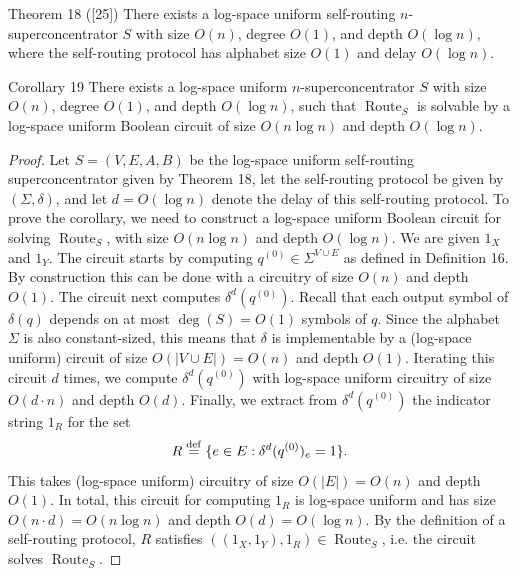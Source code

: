 \begin{originalresult}{Theorem 18 ([25])}
There exists a log-space uniform self-routing $n$-superconcentrator $S$ with size $O(n)$, degree $O(1)$, and depth $O(\log n)$, where the self-routing protocol has alphabet size $O(1)$ and delay $O(\log n)$.
\end{originalresult}
\begin{originalresult}{Corollary 19}
There exists a log-space uniform $n$-superconcentrator $S$ with size $O(n)$, degree $O(1)$, and depth $O(\log n)$, such that $\operatorname{Route}_S$ is solvable by a log-space uniform Boolean circuit of size $O(n\log n)$ and depth $O(\log n)$.
\end{originalresult}
\begin{proof}
Let $S=(V,E,A,B)$ be the log-space uniform self-routing superconcentrator given by Theorem 18, let the self-routing protocol be given by $(\Sigma,\delta)$, and let $d=O(\log n)$ denote the delay of this self-routing protocol. To prove the corollary, we need to construct a log-space uniform Boolean circuit for solving $\operatorname{Route}_S$, with size $O(n\log n)$ and depth $O(\log n)$.
We are given $1_X$ and $1_Y$. The circuit starts by computing $q^{(0)}\in\Sigma^{V\cup E}$ as defined in Definition 16. By construction this can be done with a circuitry of size $O(n)$ and depth $O(1)$. The circuit next computes $\delta^d(q^{(0)})$. Recall that each output symbol of $\delta(q)$ depends on at most $\deg(S)=O(1)$ symbols of $q$. Since the alphabet $\Sigma$ is also constant-sized, this means that $\delta$ is implementable by a (log-space uniform) circuit of size $O(|V\cup E|)=O(n)$ and depth $O(1)$. Iterating this circuit $d$ times, we compute $\delta^d(q^{(0)})$ with log-space uniform circuitry of size $O(d\cdot n)$ and depth $O(d)$. Finally, we extract from $\delta^d(q^{(0)})$ the indicator string $1_R$ for the set
\[R\stackrel{\rm def}=\{e\in E:\delta^d(q^{(0)})_e=1\}.\]
This takes (log-space uniform) circuitry of size $O(|E|)=O(n)$ and depth $O(1)$.
In total, this circuit for computing $1_R$ is log-space uniform and has size $O(n\cdot d)=O(n\log n)$ and depth $O(d)=O(\log n)$. By the definition of a self-routing protocol, $R$ satisfies $((1_X,1_Y),1_R)\in\operatorname{Route}_S$, i.e. the circuit solves $\operatorname{Route}_S$.
\end{proof}
